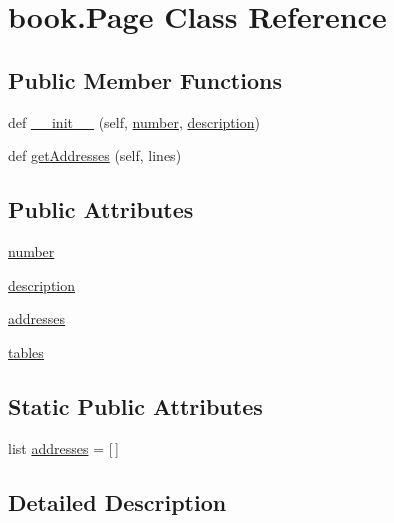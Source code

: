 \hypertarget{classbook_1_1_page}{}\section{book.\+Page Class Reference}
\label{classbook_1_1_page}
\subsection*{Public Member Functions}
\begin{DoxyCompactItemize}
\item 
def \hyperlink{classbook_1_1_page_afa51fb076c070cb92e93a79ee1339b1b}{\+\_\+\+\_\+init\+\_\+\+\_\+} (self, \hyperlink{classbook_1_1_page_aa05434b758c1957bbf56d2a8dbcf90c3}{number}, \hyperlink{classbook_1_1_page_a3215c3f1b982bf514ff90da13051596a}{description})
\item 
def \hyperlink{classbook_1_1_page_afcfec6be6c389b1513d0928713531808}{get\+Addresses} (self, lines)
\end{DoxyCompactItemize}
\subsection*{Public Attributes}
\begin{DoxyCompactItemize}
\item 
\hyperlink{classbook_1_1_page_aa05434b758c1957bbf56d2a8dbcf90c3}{number}
\item 
\hyperlink{classbook_1_1_page_a3215c3f1b982bf514ff90da13051596a}{description}
\item 
\hyperlink{classbook_1_1_page_a7e84efae20bbdabe92be054bcc95d2ac}{addresses}
\item 
\hyperlink{classbook_1_1_page_a8de9f5705a48c104b39f7f5c80726ead}{tables}
\end{DoxyCompactItemize}
\subsection*{Static Public Attributes}
\begin{DoxyCompactItemize}
\item 
list \hyperlink{classbook_1_1_page_a5355382812b7fdf00c0ca14fe65df271}{addresses} = \mbox{[}$\,$\mbox{]}
\end{DoxyCompactItemize}


\subsection{Detailed Description}


